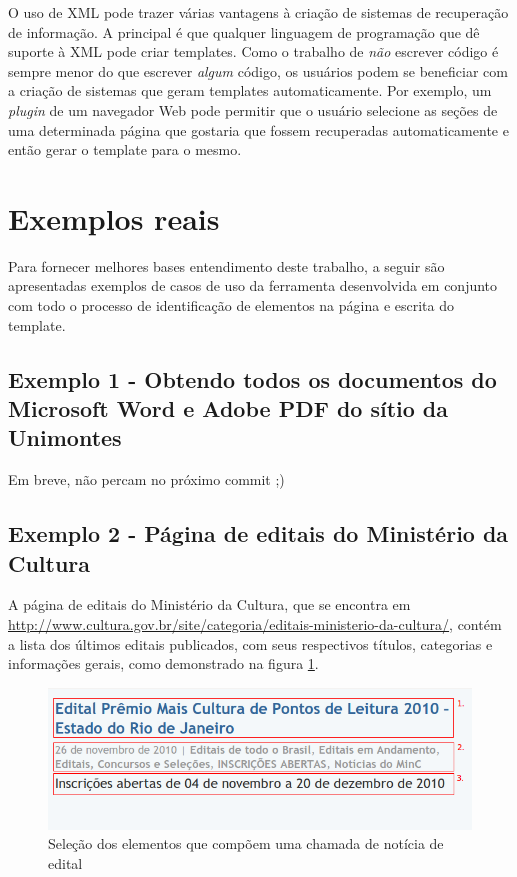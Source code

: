O uso de XML pode trazer várias vantagens à criação de sistemas de recuperação de informação. A principal é que qualquer linguagem de programação que dê suporte à XML pode criar templates. Como o trabalho de \emph{não} escrever código é sempre menor do que escrever \emph{algum} código, os usuários podem se beneficiar com a criação de sistemas que geram templates automaticamente. Por exemplo, um \emph{plugin} de um navegador Web pode permitir que o usuário selecione as seções de uma determinada página que gostaria que fossem recuperadas automaticamente e então gerar o template para o mesmo.

\pagebreak
\section{Exemplos reais}

Para fornecer melhores bases entendimento deste trabalho, a seguir são apresentadas exemplos de casos de uso da ferramenta desenvolvida em conjunto com todo o processo de identificação de elementos na página e escrita do template.

\subsection{Exemplo 1 - Obtendo todos os documentos do Microsoft Word e Adobe PDF do sítio da Unimontes}

Em breve, não percam no próximo commit ;)

\subsection{Exemplo 2 - Página de editais do Ministério da Cultura}

A página de editais do Ministério da Cultura, que se encontra em \url{http://www.cultura.gov.br/site/categoria/editais-ministerio-da-cultura/}, contém a lista dos últimos editais publicados, com seus respectivos títulos, categorias e informações gerais, como demonstrado na figura \ref{minc}.

\begin{figure} [ht]
	\centering
	\includegraphics[scale=0.8]{minc.png}
	\caption{Seleção dos elementos que compõem uma chamada de notícia de edital}
	\label{minc}
\end{figure}

